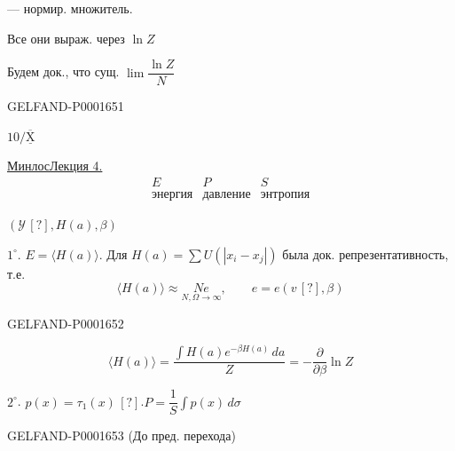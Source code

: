 — нормир. множитель.


Все они выраж. через $\ln Z$

Будем док., что сущ. $\lim\dfrac{\ln Z}{N}$



\begin{GelfandAdjacentEvidence}{GELFAND-P000165}{1}
\hfill{}


$10/\overline{\underline{\mathrm{X}}}$\quad {}


\underline{Минлос}\qquad \underline{Лекция 4.}
\begin{equation*}
\begin{array}{ccc}
E&P&S\\
\text{энергия}&\text{давление}&\text{энтропия}
\end{array}
\end{equation*}


$(\mathcal{Y}\, [?],H(a),\beta)$
\end{GelfandAdjacentEvidence}


$1^\circ$. $E=\langle H(a)\rangle$. Для $H(a)=\sum U(|x_i-x_j|)$ была док. репрезентативность, т.е.
\begin{equation*}
\langle H(a)\rangle\approx\underset{N,\Omega\longrightarrow\infty}{Ne},\qquad e=e(v\, [?],\beta)
\end{equation*}

\begin{GelfandAdjacentEvidence}{GELFAND-P000165}{2}
\end{GelfandAdjacentEvidence}

\begin{equation*}
\langle H(a)\rangle=\frac{\int H(a)e^{-\beta H(a)}\,da}{Z}=-\frac{\partial}{\partial\beta}\ln Z
\end{equation*}


$2^\circ$. $p(x)=\tau_1(x)\, [?]$.\quad $P=\dfrac{1}{S}\int p(x)\,d\sigma$

\begin{GelfandAdjacentEvidence}{GELFAND-P000165}{3}
(До пред. перехода)
\end{GelfandAdjacentEvidence}

